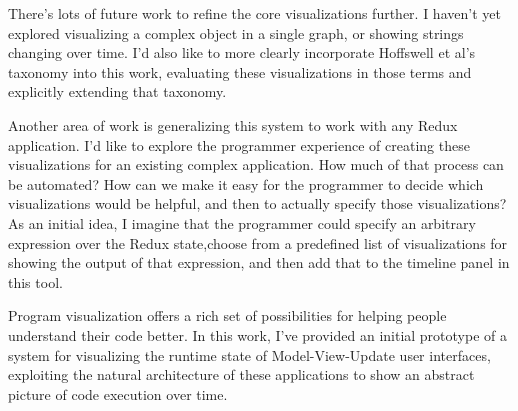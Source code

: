 \documentclass{sigchi}
\begin{document}
There's lots of future work to refine the core visualizations further. I
haven't yet explored visualizing a complex object in a single graph, or
showing strings changing over time. I'd also like to more clearly
incorporate Hoffswell et al's taxonomy \autocite{hoffswell2018a} into
this work, evaluating these visualizations in those terms and explicitly
extending that taxonomy.

Another area of work is generalizing this system to work with any Redux
application. I'd like to explore the programmer experience of creating
these visualizations for an existing complex application. How much of
that process can be automated? How can we make it easy for the
programmer to decide which visualizations would be helpful, and then to
actually specify those visualizations? As an initial idea, I imagine
that the programmer could specify an arbitrary expression over the Redux
state,choose from a predefined list of visualizations for showing the
output of that expression, and then add that to the timeline panel in
this tool.

Program visualization offers a rich set of possibilities for helping
people understand their code better. In this work, I've provided an
initial prototype of a system for visualizing the runtime state of
Model-View-Update user interfaces, exploiting the natural architecture
of these applications to show an abstract picture of code execution over
time.

%
%
%
%
%
\balance{}

% 
% 

\printbibliography
\end{document}
